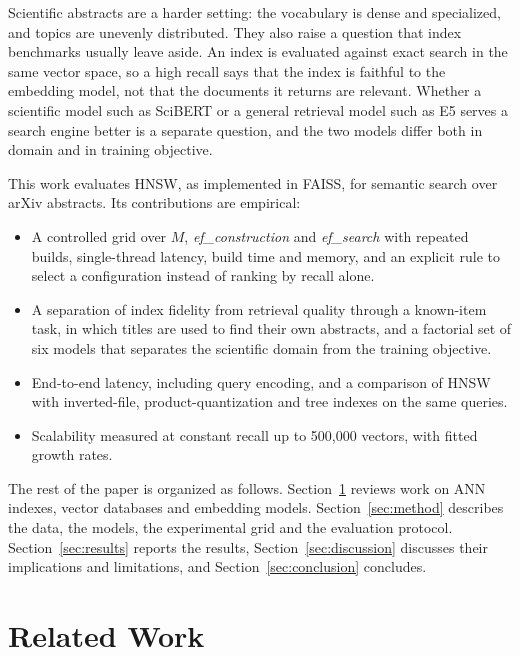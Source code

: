 \documentclass[conference, letterpaper]{IEEEtran}
\newcommand{\efc}{\textit{ef\_construction}}
\newcommand{\efs}{\textit{ef\_search}}
\begin{document}
Scientific abstracts are a harder setting: the vocabulary is dense and specialized, and topics are unevenly distributed. They also raise a question that index benchmarks usually leave aside. An index is evaluated against exact search in the same vector space, so a high recall says that the index is faithful to the embedding model, not that the documents it returns are relevant. Whether a scientific model such as SciBERT \cite{beltagy2019} or a general retrieval model such as E5 \cite{wang2022} serves a search engine better is a separate question, and the two models differ both in domain and in training objective.

This work evaluates HNSW, as implemented in FAISS, for semantic search over arXiv abstracts. Its contributions are empirical:
\begin{itemize}
\item A controlled grid over $M$, \efc{} and \efs{} with repeated builds, single-thread latency, build time and memory, and an explicit rule to select a configuration instead of ranking by recall alone.
\item A separation of index fidelity from retrieval quality through a known-item task, in which titles are used to find their own abstracts, and a factorial set of six models that separates the scientific domain from the training objective.
\item End-to-end latency, including query encoding, and a comparison of HNSW with inverted-file, product-quantization and tree indexes on the same queries.
\item Scalability measured at constant recall up to 500,000 vectors, with fitted growth rates.
\end{itemize}

The rest of the paper is organized as follows. Section~\ref{sec:related} reviews work on ANN indexes, vector databases and embedding models. Section~\ref{sec:method} describes the data, the models, the experimental grid and the evaluation protocol. Section~\ref{sec:results} reports the results, Section~\ref{sec:discussion} discusses their implications and limitations, and Section~\ref{sec:conclusion} concludes.

\section{Related Work}
\label{sec:related}
\end{document}
